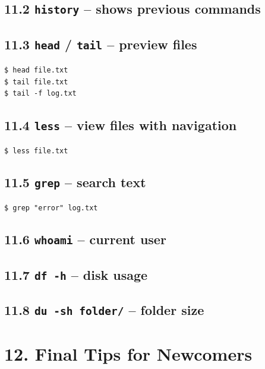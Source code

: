 \documentclass[12pt]{article}
\begin{document}
\subsection*{11.2 \texttt{history} – shows previous commands}

\subsection*{11.3 \texttt{head} / \texttt{tail} – preview files}

\begin{highlightbox}
\texttt{\$ head file.txt}\\
\texttt{\$ tail file.txt}\\
\texttt{\$ tail -f log.txt}
\end{highlightbox}

\subsection*{11.4 \texttt{less} – view files with navigation}

\begin{highlightbox}
\texttt{\$ less file.txt}
\end{highlightbox}

\subsection*{11.5 \texttt{grep} – search text}

\begin{highlightbox}
\texttt{\$ grep "error" log.txt}
\end{highlightbox}

\subsection*{11.6 \texttt{whoami} – current user}

\subsection*{11.7 \texttt{df -h} – disk usage}

\subsection*{11.8 \texttt{du -sh folder/} – folder size}

\section*{12. Final Tips for Newcomers}
\end{document}
